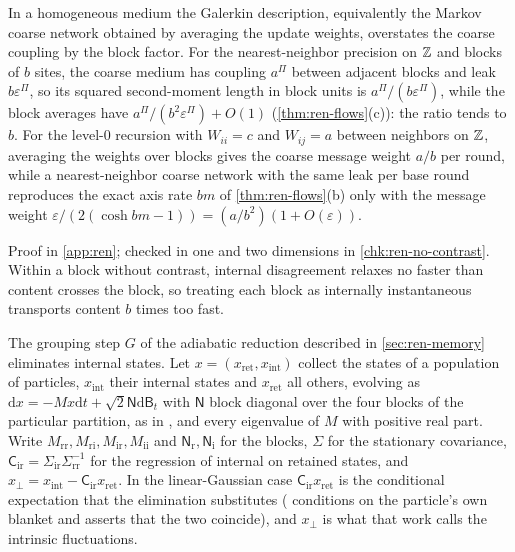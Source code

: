 \begin{example}\label{ex:ren-no-contrast}
In a homogeneous medium the Galerkin description, equivalently the Markov coarse network obtained by averaging the update weights, overstates the coarse coupling by the block factor. For the nearest-neighbor precision on $\mathbb{Z}$ and blocks of $b$ sites, the coarse medium has coupling $a^\Pi$ between adjacent blocks and leak $b\varepsilon^\Pi$, so its squared second-moment length in block units is $a^\Pi/(b\varepsilon^\Pi)$, while the block averages have $a^\Pi/(b^2\varepsilon^\Pi)+O(1)$ (\cref{thm:ren-flows}(c)): the ratio tends to $b$. For the level-0 recursion with $W_{ii}=c$ and $W_{ij}=a$ between neighbors on $\mathbb{Z}$, averaging the weights over blocks gives the coarse message weight $a/b$ per round, while a nearest-neighbor coarse network with the same leak per base round reproduces the exact axis rate $bm$ of \cref{thm:ren-flows}(b) only with the message weight $\varepsilon/(2(\cosh bm-1))=(a/b^2)(1+O(\varepsilon))$.
\end{example}
Proof in \cref{app:ren}; checked in one and two dimensions in \cref{chk:ren-no-contrast}. Within a block without contrast, internal disagreement relaxes no faster than content crosses the block, so treating each block as internally instantaneous transports content $b$ times too fast.

The grouping step $G$ of the adiabatic reduction described in \cref{sec:ren-memory} eliminates internal states. Let $x=(x_{\mathrm{ret}},x_{\mathrm{int}})$ collect the states of a population of particles, $x_{\mathrm{int}}$ their internal states and $x_{\mathrm{ret}}$ all others, evolving as $\mathrm dx=-Mx\mathrm dt+\sqrt2\mathsf N\mathrm d\mathsf B_t$ with $\mathsf N$ block diagonal over the four blocks of the particular partition, as in \citet{friston2023path}, and every eigenvalue of $M$ with positive real part. Write $M_{\mathrm{rr}},M_{\mathrm{ri}},M_{\mathrm{ir}},M_{\mathrm{ii}}$ and $\mathsf N_{\mathrm r},\mathsf N_{\mathrm i}$ for the blocks, $\Sigma$ for the stationary covariance, $\mathsf C_{\mathrm{ir}}=\Sigma_{\mathrm{ir}}\Sigma_{\mathrm{rr}}^{-1}$ for the regression of internal on retained states, and $x_\perp=x_{\mathrm{int}}-\mathsf C_{\mathrm{ir}}x_{\mathrm{ret}}$. In the linear-Gaussian case $\mathsf C_{\mathrm{ir}}x_{\mathrm{ret}}$ is the conditional expectation that the elimination substitutes (\citet{friston2019free} conditions on the particle's own blanket and asserts that the two coincide), and $x_\perp$ is what that work calls the intrinsic fluctuations.

